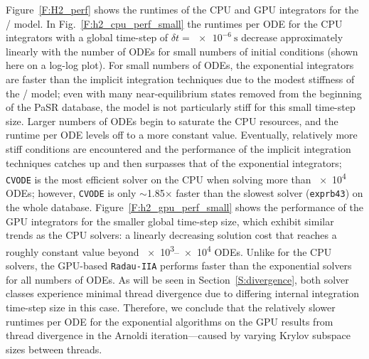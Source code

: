 \documentclass[preprint,review,11pt]{elsarticle}
\begin{document}
Figure~\ref{F:H2_perf} shows the runtimes of the CPU and GPU integrators for the \slash{} model.
In Fig.~\ref{F:h2_cpu_perf_small} the runtimes per ODE for the CPU integrators with a global time-step of $\delta t= \SI{e-6}{\second}$ decrease approximately linearly with the number of ODEs for small numbers of initial conditions (shown here on a log-log plot).
For small numbers of ODEs, the exponential integrators are faster than the implicit integration techniques due to the modest stiffness of the \slash{} model; even with many near-equilibrium states removed from the beginning of the PaSR database, the model is not particularly stiff for this small time-step size.
Larger numbers of ODEs begin to saturate the CPU resources, and the runtime per ODE levels off to a more constant value.
Eventually, relatively more stiff conditions are encountered and the performance of the implicit integration techniques catches up and then surpasses that of the exponential integrators; \texttt{CVODE} is the most efficient solver on the CPU when solving more than \num{e4} ODEs; however, \texttt{CVODE} is only $\sim$\num{1.85}$\times$ faster than the slowest solver (\texttt{exprb43}) on the whole database.
Figure~\ref{F:h2_gpu_perf_small} shows the performance of the GPU integrators for the smaller global time-step size, which exhibit similar trends as the CPU solvers: a linearly decreasing solution cost that reaches a roughly constant value beyond \numrange{e3}{e4} ODEs.
Unlike for the CPU solvers, the GPU-based \texttt{Radau-IIA} performs faster than the exponential solvers for all numbers of ODEs.
As will be seen in Section~\ref{S:divergence}, both solver classes experience minimal thread divergence due to differing internal integration time-step size in this case.
Therefore, we conclude that the relatively slower runtimes per ODE for the exponential algorithms on the GPU results from thread divergence in the Arnoldi iteration---caused by varying Krylov subspace sizes between threads.
\end{document}
